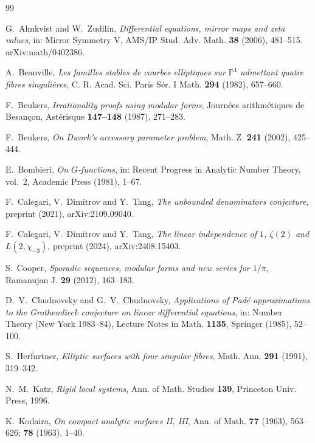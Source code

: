 \documentclass[11pt,reqno]{amsart}
\theoremstyle{plain}
\theoremstyle{definition}
\theoremstyle{remark}
\theoremstyle{plain}
\newcommand{\PP}{\mathbb{P}}
\begin{document}
\begin{thebibliography}{99}
\footnotesize
\setlength{\itemsep}{0pt plus 0.5pt}

G.~Almkvist and W.~Zudilin,
\emph{Differential equations, mirror maps and zeta values},
in: Mirror Symmetry V, AMS/IP Stud. Adv. Math. \textbf{38} (2006), 481--515.
arXiv:math/0402386.

A.~Beauville,
\emph{Les familles stables de courbes elliptiques sur $\PP^1$ admettant quatre
fibres singuli\`eres},
C. R. Acad. Sci. Paris S\'er. I Math. \textbf{294} (1982), 657--660.

F.~Beukers,
\emph{Irrationality proofs using modular forms},
Journ\'ees arithm\'etiques de Besan\c{c}on, Ast\'erisque \textbf{147--148}
(1987), 271--283.

F.~Beukers,
\emph{On Dwork's accessory parameter problem},
Math. Z. \textbf{241} (2002), 425--444.

E.~Bombieri,
\emph{On $G$-functions},
in: Recent Progress in Analytic Number Theory, vol.~2, Academic Press (1981),
1--67.

F.~Calegari, V.~Dimitrov and Y.~Tang,
\emph{The unbounded denominators conjecture},
preprint (2021), arXiv:2109.09040.

F.~Calegari, V.~Dimitrov and Y.~Tang,
\emph{The linear independence of $1$, $\zeta(2)$ and $L(2,\chi_{-3})$},
preprint (2024), arXiv:2408.15403.

S.~Cooper,
\emph{Sporadic sequences, modular forms and new series for $1/\pi$},
Ramanujan J. \textbf{29} (2012), 163--183.

D.~V.~Chudnovsky and G.~V.~Chudnovsky,
\emph{Applications of Pad\'e approximations to the Grothendieck conjecture on
linear differential equations},
in: Number Theory (New York 1983--84), Lecture Notes in Math. \textbf{1135},
Springer (1985), 52--100.

S.~Herfurtner,
\emph{Elliptic surfaces with four singular fibres},
Math. Ann. \textbf{291} (1991), 319--342.

N.~M.~Katz,
\emph{Rigid local systems},
Ann. of Math. Studies \textbf{139}, Princeton Univ. Press, 1996.

K.~Kodaira,
\emph{On compact analytic surfaces II, III},
Ann. of Math. \textbf{77} (1963), 563--626; \textbf{78} (1963), 1--40.


\end{thebibliography}
\end{document}
